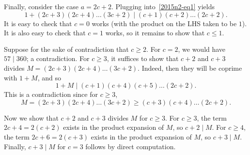 \documentclass{article}
\begin{document}
Finally, consider the case $a = 2c + 2$.
Plugging into~\eqref{2015n2-eq1} yields
\[ 1 + (2c + 3)(2c + 4) \ldots (3c + 2) \mid (c + 1)(c + 2) \ldots (2c + 2). \]
It is easy to check that $c = 0$ works (with the product on the LHS taken to be $1$).
It is also easy to check that $c = 1$ works, so it remains to show that $c \leq 1$.

Suppose for the sake of contradiction that $c \geq 2$.
For $c = 2$, we would have $57 \mid 360$; a contradiction.
For $c \geq 3$, it suffices to show that $c + 2$ and $c + 3$ divides $M = (2c + 3)(2c + 4) \ldots (3c + 2)$.
Indeed, then they will be coprime with $1 + M$, and so
\[ 1 + M \mid (c + 1)(c + 4)(c + 5) \ldots (2c + 2). \]
This is a contradiction since for $c \geq 3$,
\[ M = (2c + 3)(2c + 4) \ldots (3c + 2) \geq (c + 3)(c + 4) \ldots (2c + 2). \]

Now we show that $c + 2$ and $c + 3$ divides $M$ for $c \geq 3$.
For $c \geq 3$, the term $2c + 4 = 2(c + 2)$ exists in the product expansion of $M$, so $c + 2 \mid M$.
For $c \geq 4$, the term $2c + 6 = 2(c + 3)$ exists in the product expansion of $M$, so $c + 3 \mid M$.
Finally, $c + 3 \mid M$ for $c = 3$ follows by direct computation.
\end{document}
